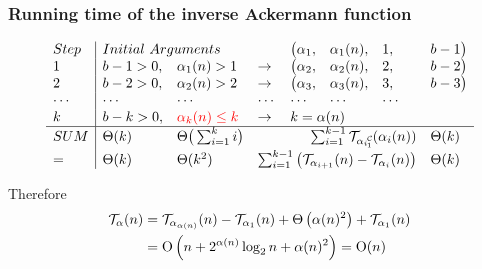 \begin{frame}
\frametitle{Running time of the inverse Ackermann function}

\begin{equation*}
\begin{array}{l|llllllll}
Step & \multicolumn{2}{l}{Initial \ Arguments} &  &  \big(\alpha_1, & \alpha_1(n), & 1, & b - 1 \big) \\
1 & b - 1 > 0, & \alpha_1(n) > 1 & \to & \big(\alpha_2, & \alpha_2(n), & 2, & b - 2\big) \\
2 & b - 2 > 0, & \alpha_2(n) > 2 & \to  & \big(\alpha_3, & \alpha_3(n), & 3, & b - 3\big) \\
\cdots & \cdots &\cdots & \cdots & \cdots & \cdots & \cdots \\
k & b - k > 0, & {\color{red} \alpha_{k}(n) \le k} & \to  & \multicolumn{4}{l}{k = \alpha(n)} \\ \hline
SUM & \Theta(k) & \Theta\big(\sum_{i=1}^{k}i\big) & & \multicolumn{3}{r}{\sum_{i=1}^{k-1} \runtime_{\cdt{\alpha_i}{1}} (\alpha_i(n))} & \Theta(k) \\[3pt]
= & \Theta(k) & \Theta(k^2) & \multicolumn{4}{r}{\sum_{i=1}^{k-1} \big(\runtime_{\alpha_{i+1}}(n) - \runtime_{\alpha_i}(n) \big)} & \Theta(k)
\end{array}
\end{equation*}

\smallskip

Therefore
\begin{equation*}
\begin{aligned}
\mathcal{T}_{\alpha}(n)
& = \mathcal{T}_{\alpha_{\alpha(n)}}(n) - \mathcal{T}_{\alpha_1}(n) + \Theta\left(\alpha(n)^2\right) + \mathcal{T}_{\alpha_1}(n) \\
& = \text{O} \left(n + 2^{\alpha(n)}\log_2n + \alpha(n)^2 \right) = \text{O} (n)
\end{aligned}
\end{equation*}

\end{frame}